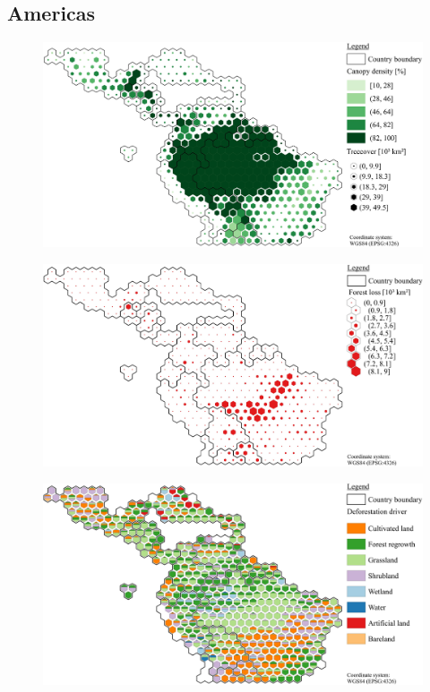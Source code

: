 		\subsection{Americas}
			\begin{figure}[ht]
				\centering
				\includegraphics[scale=1]{img/americas_treecover_frameless}
				\caption[Ecosystem service values]{}
				\label{fig:americascover}
			\end{figure}
			\begin{figure}[ht]
				\centering
				\includegraphics[scale=1]{img/americas_loss_frameless}
				\caption[Ecosystem service values]{}
				\label{fig:americasloss}
			\end{figure}
			\begin{figure}[ht]
				\centering
				\includegraphics[scale=1]{img/americas_driver_frameless}
				\caption[Ecosystem service values]{}
				\label{fig:americasdriver}
			\end{figure}


